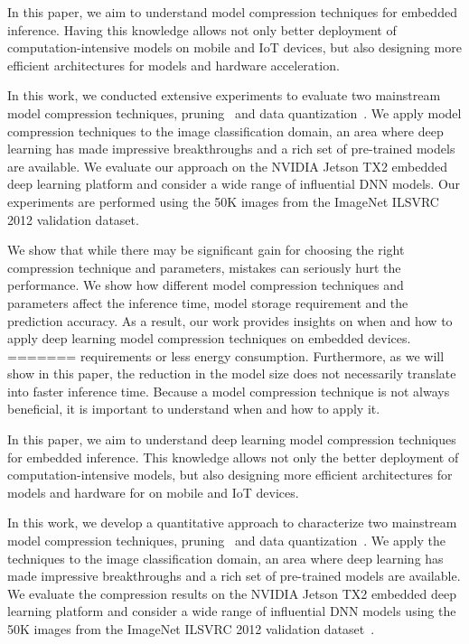 In this paper, we aim to understand model compression techniques for embedded inference. Having this knowledge allows not only better
deployment of computation-intensive models on mobile and IoT devices, but also designing more efficient architectures for models and
hardware acceleration.

In this work, we conducted extensive experiments to evaluate two mainstream model compression techniques, pruning~\cite{Li2016Pruning} and data
quantization~\cite{Gong2014Compressing}. We apply model compression techniques to the image classification domain, an area where deep learning has made
impressive breakthroughs and a rich set of pre-trained models are available. We evaluate our approach on the NVIDIA Jetson TX2 embedded
deep learning platform and consider a wide range of influential DNN models. Our experiments are performed using the 50K images from the
ImageNet ILSVRC 2012 validation dataset.

We show that while there may be significant gain for choosing the right compression technique and parameters, mistakes can seriously hurt
the performance. We show how different model compression techniques and parameters affect the inference time, model storage requirement and
the prediction accuracy. As a result, our work provides insights on when and how to apply deep learning model compression techniques on
embedded devices.
=======
requirements or less energy consumption. Furthermore, as we will show in this paper, the reduction in the model size does not necessarily
translate into faster inference time. Because a model compression technique is not always beneficial, it is important to understand when
and how to apply it.

In this paper, we aim to understand deep learning model compression techniques for embedded inference. This knowledge allows not only the
better deployment of computation-intensive models, but also designing more efficient architectures for models and hardware for on mobile
and IoT devices.

In this work, we develop a quantitative approach  to characterize two mainstream model compression techniques, pruning~\cite{} and data
quantization~\cite{}. We apply the techniques to the image classification domain, an area where deep learning has made impressive
breakthroughs and a rich set of pre-trained models are available. We evaluate the compression results on the NVIDIA Jetson TX2 embedded
deep learning platform and consider a wide range of influential DNN models using the 50K images from the ImageNet ILSVRC 2012 validation
dataset~\cite{}.

